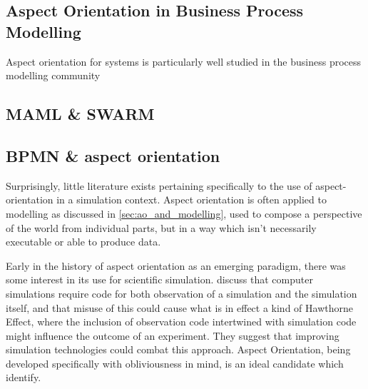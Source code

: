 \subsection{Aspect Orientation in Business Process Modelling}
Aspect orientation for \sociotechnical systems is particularly well studied in
the business process modelling
community\cite{Machado_2011,Cappelli_AOBPM}~


\subsection{MAML \& SWARM}


\subsection{BPMN \& aspect orientation}




Surprisingly, little literature exists pertaining specifically to the use of
aspect-orientation in a simulation context. Aspect orientation is often applied
to modelling as discussed in \cref{sec:ao_and_modelling}, used to compose a
perspective of the world from individual parts, but in a way which isn't
necessarily executable or able to produce data.

Early in the history of aspect orientation as an emerging paradigm, there was
some interest in its use for scientific simulation. \cite{gulyas1999use} discuss
that computer simulations require code for both observation of a simulation and
the simulation itself, and that misuse of this could cause what is in effect a
kind of Hawthorne Effect, where
the inclusion of observation code intertwined with simulation code might
influence the outcome of an experiment. They suggest that improving simulation
technologies could combat this approach. Aspect Orientation, being developed
specifically with obliviousness in mind, is an ideal candidate which
\citeauthor{gulyas1999use} identify.

